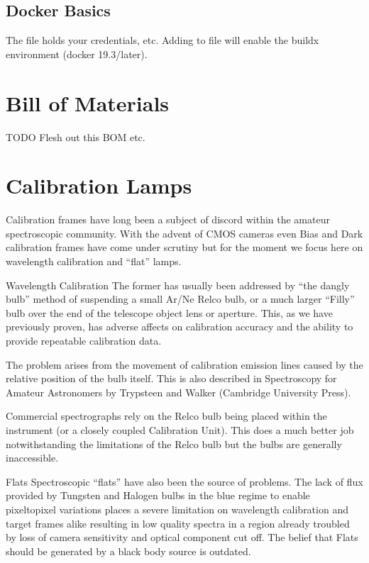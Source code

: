 \documentclass[letterpaper,10pt,english,openany,oneside]{sphinxmanual}
\begin{document}
\section{Docker Basics}
\label{\detokenize{docker:docker-basics}}
\sphinxAtStartPar
The file  holds your credentials, etc.
Adding  to file will enable the buildx
environment (docker 19.3/later).


\chapter{Bill of Materials}
\label{\detokenize{bom:bill-of-materials}}\label{\detokenize{bom:flexspec1-bom}}\label{\detokenize{bom::doc}}
\sphinxAtStartPar
TODO Flesh out this BOM etc.


\chapter{Calibration Lamps}
\label{\detokenize{callamps:calibration-lamps}}\label{\detokenize{callamps::doc}}
\sphinxAtStartPar
Calibration frames have long been a subject of discord within the
amateur spectroscopic community.  With the advent of CMOS cameras even
Bias and Dark calibration frames have come under scrutiny but for the
moment we focus here on wavelength calibration and “flat” lamps.

\sphinxAtStartPar
Wavelength Calibration
The former has usually been addressed by “the dangly bulb” method
of suspending a small Ar/Ne Relco bulb, or a much larger “Filly” bulb
over the end of the telescope object lens or aperture.  This, as we
have previously proven, has adverse affects on calibration accuracy
and the ability to provide repeatable calibration data.

\sphinxAtStartPar
The problem arises from the movement of calibration emission lines
caused by the relative position of the bulb itself.  This is also
described in Spectroscopy for Amateur Astronomers by Trypsteen and
Walker (Cambridge University Press).

\sphinxAtStartPar
Commercial spectrographs rely on the Relco bulb being placed within
the instrument (or a closely coupled Calibration Unit).  This does
a much better job notwithstanding the limitations of the Relco bulb
but the bulbs are generally inaccessible.

\sphinxAtStartPar
Flats
Spectroscopic “flats” have also been the source of problems.  The lack
of flux provided by Tungsten and Halogen bulbs in the blue regime
to enable pixel\sphinxhyphen{}to\sphinxhyphen{}pixel variations places a severe limitation on
wavelength calibration and target frames alike resulting in low
quality spectra in a region already troubled by loss of camera
sensitivity and optical component cut off.  The belief that
Flats should be generated by a black body source is outdated.
\end{document}
